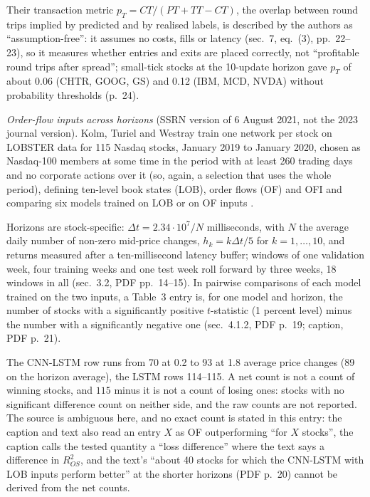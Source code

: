 \begin{qfdefinition}
Their transaction metric $p_T=CT/(PT+TT-CT)$, the overlap between round trips implied by predicted and by realised labels, is described by the authors as ``assumption-free'': it assumes no costs, fills or latency (sec.~7, eq.~(3), pp.~22--23), so it measures whether entries and exits are placed correctly, not ``profitable round trips after spread''; small-tick stocks at the 10-update horizon gave $p_T$ of about 0.06 (CHTR, GOOG, GS) and 0.12 (IBM, MCD, NVDA) without probability thresholds (p.~24).

\emph{Order-flow inputs across horizons} (SSRN version of 6 August 2021, not the 2023 journal version). Kolm, Turiel and Westray train one network per stock on LOBSTER data for 115 Nasdaq stocks, January 2019 to January 2020, chosen as Nasdaq-100 members at some time in the period with at least 260 trading days and no corporate actions over it (so, again, a selection that uses the whole period), defining ten-level book states (LOB), order flows (OF) and OFI and comparing six models trained on LOB or on OF inputs \citep[SSRN version, secs.~2.1 and~3.1, PDF pp.~5--7 and~12]{wide-kolm-deep-ofi}.

Horizons are stock-specific: $\Delta t=2.34\cdot10^7/N$ milliseconds, with $N$ the average daily number of non-zero mid-price changes, $h_k=k\Delta t/5$ for $k=1,\dots,10$, and returns measured after a ten-millisecond latency buffer; windows of one validation week, four training weeks and one test week roll forward by three weeks, 18 windows in all (sec.~3.2, PDF pp.~14--15). In pairwise comparisons of each model trained on the two inputs, a Table~3 entry is, for one model and horizon, the number of stocks with a significantly positive $t$-statistic (1 percent level) minus the number with a significantly negative one (sec.~4.1.2, PDF p.~19; caption, PDF p.~21).

The CNN-LSTM row runs from 70 at 0.2 to 93 at 1.8 average price changes (89 on the horizon average), the LSTM rows 114--115. A net count is not a count of winning stocks, and $115$ minus it is not a count of losing ones: stocks with no significant difference count on neither side, and the raw counts are not reported. The source is ambiguous here, and no exact count is stated in this entry: the caption and text also read an entry $X$ as OF outperforming ``for $X$ stocks'', the caption calls the tested quantity a ``loss difference'' where the text says a difference in $R^2_{OS}$, and the text's ``about 40 stocks for which the CNN-LSTM with LOB inputs perform better'' at the shorter horizons (PDF p.~20) cannot be derived from the net counts.


\end{qfdefinition}
